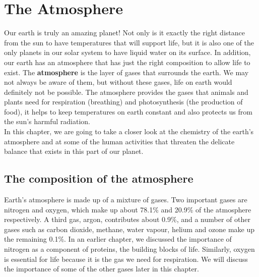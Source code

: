 



\chapter{The Atmosphere}
\label{chap:atmosphere}

Our earth is truly an amazing planet! Not only is it exactly the right distance from the sun to have temperatures that will support life, but it is also one of the only planets in our solar system to have liquid water on its surface. In addition, our earth has an atmosphere that has just the right composition to allow life to exist. The \textbf{atmosphere} is the layer of gases that surrounds the earth. We may not always be aware of them, but without these gases, life on earth would definitely not be possible. The atmosphere provides the gases that animals and plants need for respiration (breathing) and photosynthesis (the production of food), it helps to keep temperatures on earth constant and also protects us from the sun's harmful radiation. \\ 

In this chapter, we are going to take a closer look at the chemistry of the earth's atmosphere and at some of the human activities that threaten the delicate balance that exists in this part of our planet.

\section{The composition of the atmosphere}
\label{sec:atmos:comp}

Earth's atmosphere is made up of a mixture of gases. Two important gases are nitrogen and oxygen, which make up about 78.1\% and 20.9\% of the atmosphere respectively. A third gas, argon, contributes about 0.9\%, and a number of other gases such as carbon dioxide, methane, water vapour, helium and ozone make up the remaining 0.1\%. In an earlier chapter, we discussed the importance of nitrogen as a component of proteins, the building blocks of life. Similarly, oxygen is essential for life because it is the gas we need for respiration. We will discuss the importance of some of the other gases later in this chapter.

